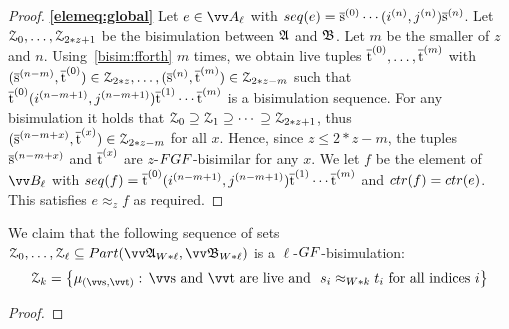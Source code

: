 \begin{proof}
\noindent
\textbf{\ref{elemeq:global}}
Let $e \in \unraveldom{A}_{\ell}$ with $\seq{e} = \elemtuples^{(0)}\cdots{}(i^{(n)}, j^{(n)})\elemtuples^{(n)}$.
Let $\mathcal{Z}_{0}, \ldots, \mathcal{Z}_{2*z + 1}$ be the bisimulation between ${\mathfrak{A}}$ and ${\mathfrak{B}}$.
Let $m$ be the smaller of $z$ and $n$.
Using~\ref{bisim:fforth} $m$ times, we obtain live tuples $\overline{\mathrm{t}}^{(0)}, \ldots, \overline{\mathrm{t}}^{(m)}$ with $(\overline{\mathrm{s}}^{(n-m)}, \overline{\mathrm{t}}^{(0)}) \in \mathcal{Z}_{2*z}, \ldots, (\overline{\mathrm{s}}^{(n)}, \overline{\mathrm{t}}^{(m)}) \in \mathcal{Z}_{2*z - m}$ such that $\overline{\mathrm{t}}^{(0)}(i^{(n-m+1)}, j^{(n-m+1)})\overline{\mathrm{t}}^{(1)}\cdots{}\overline{\mathrm{t}}^{(m)}$ is a bisimulation sequence.
For any bisimulation it holds that $\mathcal{Z}_{0} \supseteq \mathcal{Z}_{1} \supseteq \cdots{} \supseteq \mathcal{Z}_{2*z+1}$, thus
$(\overline{\mathrm{s}}^{(n-m+x)}, \overline{\mathrm{t}}^{(x)}) \in \mathcal{Z}_{2*z - m}$ for all $x$.
Hence, since $z \le 2*z - m$, the tuples $\overline{\mathrm{s}}^{(n-m+x)}$ and $\overline{\mathrm{t}}^{(x)}$ are $z$-$\FGF$-bisimilar for any $x$.
We let $f$ be the element of $\unraveldom{B}_{\ell}$ with $\seq{f} = \elemtuplet^{(0)}(i^{(n-m+1)}, j^{(n-m+1)})\elemtuplet^{(1)}\cdots{}\elemtuplet^{(m)}$ and $\ctr{f} = \ctr{e}$.
This satisfies $e \approx_{z} f$ as required.

\noindent
\end{proof}

We claim that the following sequence of sets $\bisimZ_{0}, \ldots, \bisimZ_{\ell} \subseteq \PartIso{\unravel{A}_{W * \ell}}{\unravel{B}_{W * \ell}}$ is a $\ell$-$\GF$-bisimulation:
\begin{equation*}
  \bisimZ_{k} = \left\{
    \mu_{(\elemtuptuples, \elemtuptuplet)}:\,
    \elemtuptuples\ \text{and}\ \elemtuptuplet\ \text{are live and}\ \
    s_{i} \approx_{W * k} t_{i}\ \text{for all indices $i$}
  \right\}
\end{equation*}
\begin{proof}
\end{proof}
